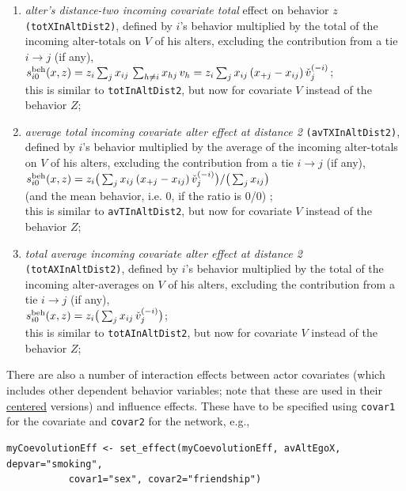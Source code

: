 \documentclass[a4paper,fleqn,11pt]{article}
\newcommand{\+}{\, + \,}
\newcommand{\vit}{\theenumi}
\newcounter{savenumi}
\begin{document}
\begin{enumerate}
 \item {\em alter's distance-two incoming covariate total} effect on behavior $z$ \texttt{(totXInAltDist2)},
 defined by  $i$'s
 behavior multiplied by the total of the incoming alter-totals on $V$ of his alters,
 excluding the contribution from a tie $i \rightarrow j$ (if any),\\
 $s^{\rm beh}_{i\vit}(x, z) = z_i \sum_j x_{ij}\, \sum_{h \neq i} x_{hj}\,v_h =
         z_i \sum_j x_{ij}\, (x_{+j}- x_{ij}) \, \check v_j^{(-i)}  $;\\[0.5ex]
 this is similar to \texttt{totInAltDist2}, but now for covariate $V$
 instead of the behavior $Z$;

 \item {\em average total incoming covariate alter effect at distance 2} \texttt{(avTXInAltDist2)},
 defined by  $i$'s
 behavior multiplied by the average of the incoming alter-totals on $V$ of his alters,
 excluding the contribution from a tie $i \rightarrow j$ (if any),\\[0.3ex]
 $s^{\rm beh}_{i\vit}(x, z) =  z_i \big( \sum_j x_{ij}\,(x_{+j}- x_{ij}) \, \check v_j^{(-i)} \big)
                                / \big (\sum_j x_{ij}\big)  $\\[0.5ex]
 (and the mean behavior, i.e. $0$, if the ratio is 0/0) ;\\
 this is similar to \texttt{avTInAltDist2}, but now for covariate $V$
 instead of the behavior $Z$;

 \item {\em total average incoming covariate alter effect at distance 2} \texttt{(totAXInAltDist2)},
 defined by  $i$'s
 behavior multiplied by the total of the incoming alter-averages on $V$ of his alters,
 excluding the contribution from a tie $i \rightarrow j$ (if any), \\[0.3ex]
 $s^{\rm beh}_{i\vit}(x, z) =  z_i \big( \sum_j x_{ij}\, \check v_j^{(-i)} \big) $;\\[0.5ex]
 this is similar to \texttt{totAInAltDist2}, but now for covariate $V$
 instead of the behavior $Z$;

\setcounter{savenumi}{\value{enumi}}
\end{enumerate}
There are also a number of interaction effects between actor covariates
(which includes other dependent behavior variables; note that these are used
in their \underline{centered} versions) and influence effects.
These have to be specified using \texttt{covar1} for the covariate
and \texttt{covar2} for the network, e.g.,
\begin{verbatim}
myCoevolutionEff <- set_effect(myCoevolutionEff, avAltEgoX, depvar="smoking",
           covar1="sex", covar2="friendship")
\end{verbatim}
\end{document}
